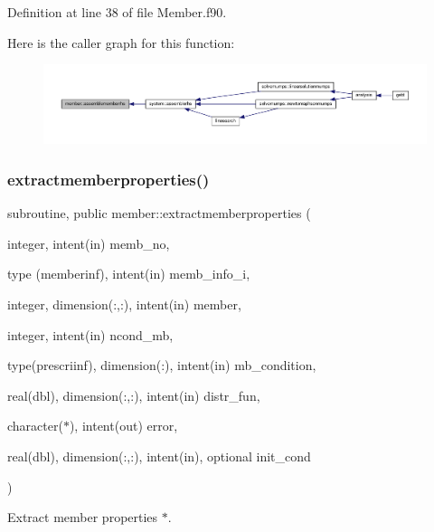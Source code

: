 Definition at line 38 of file Member.\+f90.

Here is the caller graph for this function\+:\nopagebreak
\begin{figure}[H]
\begin{center}
\leavevmode
\includegraphics[width=350pt]{namespacemember_ac35a49c8cdb17a8b26f8c4b23d6053be_icgraph}
\end{center}
\end{figure}
\mbox{\label{namespacemember_a8618a013da87b108e5e91013028fc1a8}} 
\subsubsection{\texorpdfstring{extractmemberproperties()}{extractmemberproperties()}}
{\footnotesize\ttfamily subroutine, public member\+::extractmemberproperties (\begin{DoxyParamCaption}\item[{integer, intent(in)}]{memb\+\_\+no,  }\item[{type (memberinf), intent(in)}]{memb\+\_\+info\+\_\+i,  }\item[{integer, dimension(\+:,\+:), intent(in)}]{member,  }\item[{integer, intent(in)}]{ncond\+\_\+mb,  }\item[{type(prescriinf), dimension(\+:), intent(in)}]{mb\+\_\+condition,  }\item[{real(dbl), dimension(\+:,\+:), intent(in)}]{distr\+\_\+fun,  }\item[{character($\ast$), intent(out)}]{error,  }\item[{real(dbl), dimension(\+:,\+:), intent(in), optional}]{init\+\_\+cond }\end{DoxyParamCaption})}



Extract member properties $\ast$. 


